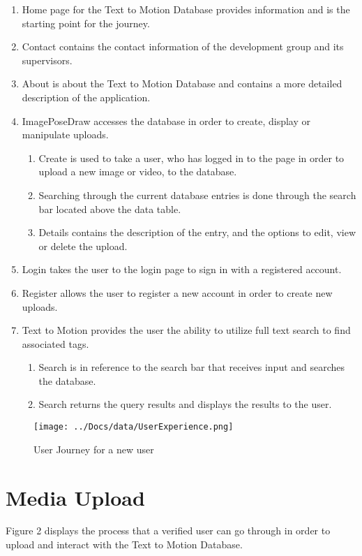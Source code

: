 \documentclass{scrreprt}
\begin{document}
\begin{enumerate}
  \item Home page for the Text to Motion Database provides information and is the starting point for the journey.
  \item Contact contains the contact information of the development group and its supervisors.
  \item About is about the Text to Motion Database and contains a more detailed description of the application.
  \item ImagePoseDraw accesses the database in order to create, display or manipulate uploads.
  \begin{enumerate}
    \item Create is used to take a user, who has logged in to the page in order to upload a new image or video, to the database.
    \item Searching through the current database entries is done through the search bar located above the data table.
    \item Details contains the description of the entry, and the options to edit, view or delete the upload.
  \end{enumerate}
  \item Login takes the user to the login page to sign in with a registered account.
  \item Register allows the user to register a new account in order to create new uploads.
  \item Text to Motion provides the user the ability to utilize full text search to find associated tags.
  \begin{enumerate}
    \item Search is in reference to the search bar that receives input and searches the database.
    \item Search returns the query results and displays the results to the user.
  \end{enumerate}
\end{enumerate}

\begin{figure}[!ht]
        \caption{User Journey for a new user}
        \label{erDiagram}
        \centering
        \texttt{[image: ../Docs/data/UserExperience.png]}
\end{figure}

\section{Media Upload}
Figure 2 displays the process that a verified user can go through in order to upload and interact with the Text to Motion Database.
\end{document}
